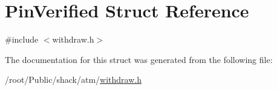 \hypertarget{structPinVerified}{\section{Pin\-Verified Struct Reference}
\label{structPinVerified}
}


{\ttfamily \#include $<$withdraw.\-h$>$}



The documentation for this struct was generated from the following file\-:\begin{DoxyCompactItemize}
\item 
/root/\-Public/shack/atm/\hyperlink{withdraw_8h}{withdraw.\-h}\end{DoxyCompactItemize}
